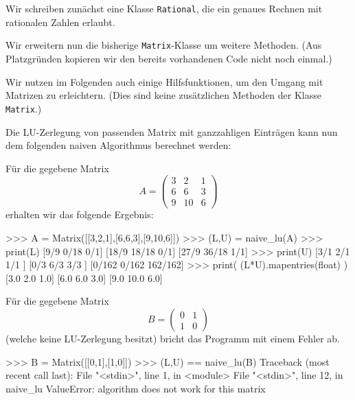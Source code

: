\section{}
\label{section: LU decomposition}

Wir schreiben zunächst eine Klasse \texttt{Rational}, die ein genaues Rechnen mit rationalen Zahlen erlaubt.



Wir erweitern nun die bisherige \texttt{Matrix}-Klasse um weitere Methoden.
(Aus Platzgründen kopieren wir den bereits vorhandenen Code nicht noch einmal.)



Wir nutzen im Folgenden auch einige Hilfsfunktionen, um den Umgang mit Matrizen zu erleichtern.
(Dies sind keine zusätzlichen Methoden der Klasse \texttt{Matrix}.)



Die LU-Zerlegung von passenden Matrix mit ganzzahligen Einträgen kann nun dem folgenden naiven Algorithmus berechnet werden:



Für die gegebene Matrix
\[
    A
    = \begin{pmatrix}
        3 &  2 & 1  \\
        6 &  6 & 3  \\
        9 & 10 & 6
      \end{pmatrix}
\]
erhalten wir das folgende Ergebnis:
\begin{consoleoutput}
>>> A = Matrix([[3,2,1],[6,6,3],[9,10,6]])
>>> (L,U) = naive_lu(A)
>>> print(L)
[9/9  0/18  0/1]
[18/9 18/18 0/1]
[27/9 36/18 1/1]
>>> print(U)
[3/1   2/1   1/1    ]
[0/3   6/3   3/3    ]
[0/162 0/162 162/162]
>>> print( (L*U).mapentries(float) )
[3.0 2.0  1.0]
[6.0 6.0  3.0]
[9.0 10.0 6.0]
\end{consoleoutput}
Für die gegebene Matrix
\[
    B
    = \begin{pmatrix}
        0 & 1 \\
        1 & 0
      \end{pmatrix}
\]
(welche keine LU-Zerlegung besitzt) bricht das Programm mit einem Fehler ab.
\begin{consoleoutput}
>>> B = Matrix([[0,1],[1,0]])
>>> (L,U) == naive_lu(B)
Traceback (most recent call last):
  File "<stdin>", line 1, in <module>
  File "<stdin>", line 12, in naive_lu
ValueError: algorithm does not work for this matrix
\end{consoleoutput}
